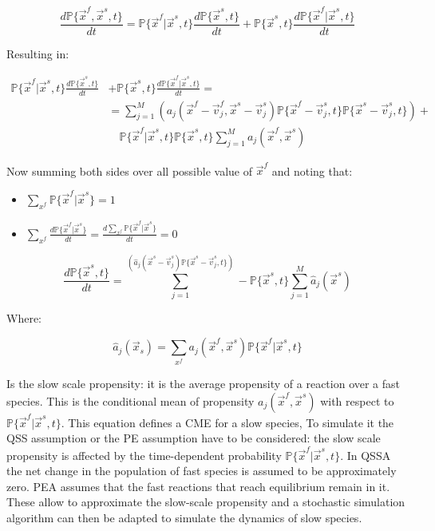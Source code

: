   $$\frac{d\mathbb{P}\{\vec{x}^f,\vec{x}^s, t\}}{dt} = \mathbb{P}\{\vec{x}^f|\vec{x}^s, t\}\frac{d\mathbb{P}\{\vec{x}^s,t\}}{dt} + \mathbb{P}\{\vec{x}^s,t\}\frac{d\mathbb{P}\{\vec{x}^f|\vec{x}^s,t\}}{dt}$$

  Resulting in:

  \begin{align*}
    \mathbb{P}\{\vec{x}^f|\vec{x}^s, t\}\frac{d\mathbb{P}\{\vec{x}^s,t\}}{dt} &+ \mathbb{P}\{\vec{x}^s,t\}\frac{d\mathbb{P}\{\vec{x}^f|\vec{x}^s,t\}}{dt} = \\
                                                                              &= \sum\limits_{j=1}^M(a_j(\vec{x}^f-\vec{v}_j^f, \vec{x}^s-\vec{v}_j^s)\mathbb{P}\{\vec{x}^f-\vec{v}_j^s,t\}\mathbb{P}\{\vec{x}^s-\vec{v}_j^s,t\})+\\
                                                                              &\quad\mathbb{P}\{\vec{x}^f|\vec{x}^s,t\}\mathbb{P}\{\vec{x}^s,t\}\sum\limits_{j=1}^Ma_j(\vec{x}^f,\vec{x}^s)
  \end{align*}

  Now summing both sides over all possible value of $\vec{x}^f$ and noting that:

  \begin{multicols}{2}
    \begin{itemize}
      \item $\sum\limits_{x^f}\mathbb{P}\{\vec{x}^f|\vec{x}^s\} = 1$\;
      \item $\sum\limits_{x^f}\frac{d\mathbb{P}\{\vec{x}^f|\vec{x}^s\}}{dt} = \frac{d\sum\limits_{x^f}\mathbb{P}\{\vec{x}^f|\vec{x}^s\}}{dt}=0$\;
    \end{itemize}
  \end{multicols}

  $$\frac{d\mathbb{P}\{\vec{x}^s,t\}}{dt} = \sum\limits_{j=1}^(\hat{a}_j(\vec{x}^s-\vec{v}_j^s)\mathbb{P}\{\vec{x}^s-\vec{v}_j^s, t\})-\mathbb{P}\{\vec{x}^s,t\}\sum\limits_{j=1}^M\hat{a}_j(\vec{x}^s)$$

  Where:

  $$\hat{a}_j(\vec{x}_s) = \sum\limits_{x^f}a_j(\vec{x}^f,\vec{x}^s)\mathbb{P}\{\vec{x}^f|\vec{x}^s,t\}$$

  Is the slow scale propensity: it is the average propensity of a reaction over a fast species.
  This is the conditional mean of propensity $a_j(\vec{x}^f, \vec{x}^s)$ with respect to $\mathbb{P}\{\vec{x}^f|\vec{x}^s,t\}$.
  This equation defines a CME for a slow species,
  To simulate it the QSS assumption or the PE assumption have to be considered: the slow scale propensity is affected by the time-dependent probability $\mathbb{P}\{\vec{x}^f|\vec{x}^s,t\}$.
  In QSSA the net change in the population of fast species is assumed to be approximately zero.
  PEA assumes that the fast reactions that reach equilibrium remain in it.
  These allow to approximate the slow-scale propensity and a stochastic simulation algorithm can then be adapted to simulate the dynamics of slow species.

